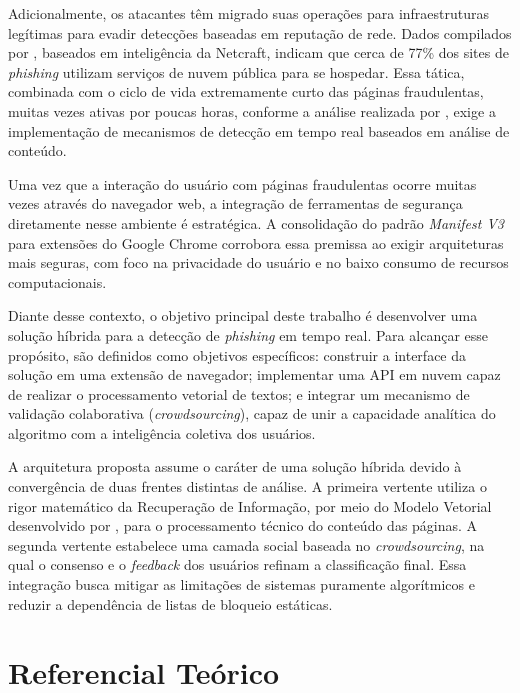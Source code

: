 \documentclass[a4paper,12pt]{article}
\begin{document}
Adicionalmente, os atacantes têm migrado suas operações para infraestruturas legítimas para evadir detecções baseadas em reputação de rede. Dados compilados por , baseados em inteligência da Netcraft, indicam que cerca de 77\% dos sites de \textit{phishing} utilizam serviços de nuvem pública para se hospedar. Essa tática, combinada com o ciclo de vida extremamente curto das páginas fraudulentas, muitas vezes ativas por poucas horas, conforme a análise realizada por , exige a implementação de mecanismos de detecção em tempo real baseados em análise de conteúdo.

Uma vez que a interação do usuário com páginas fraudulentas ocorre muitas vezes através do navegador web, a integração de ferramentas de segurança diretamente nesse ambiente é estratégica. A consolidação do padrão \textit{Manifest V3} para extensões do Google Chrome corrobora essa premissa ao exigir arquiteturas mais seguras, com foco na privacidade do usuário e no baixo consumo de recursos computacionais.

Diante desse contexto, o objetivo principal deste trabalho é desenvolver uma solução híbrida para a detecção de \textit{phishing} em tempo real. Para alcançar esse propósito, são definidos como objetivos específicos: construir a interface da solução em uma extensão de navegador; implementar uma API em nuvem capaz de realizar o processamento vetorial de textos; e integrar um mecanismo de validação colaborativa (\textit{crowdsourcing}), capaz de unir a capacidade analítica do algoritmo com a inteligência coletiva dos usuários.

A arquitetura proposta assume o caráter de uma solução híbrida devido à convergência de duas frentes distintas de análise. A primeira vertente utiliza o rigor matemático da Recuperação de Informação, por meio do Modelo Vetorial desenvolvido por , para o processamento técnico do conteúdo das páginas. A segunda vertente estabelece uma camada social baseada no \textit{crowdsourcing}, na qual o consenso e o \textit{feedback} dos usuários refinam a classificação final. Essa integração busca mitigar as limitações de sistemas puramente algorítmicos e reduzir a dependência de listas de bloqueio estáticas.

\section{Referencial Teórico}
\label{sec:ref_teorico}
\end{document}
